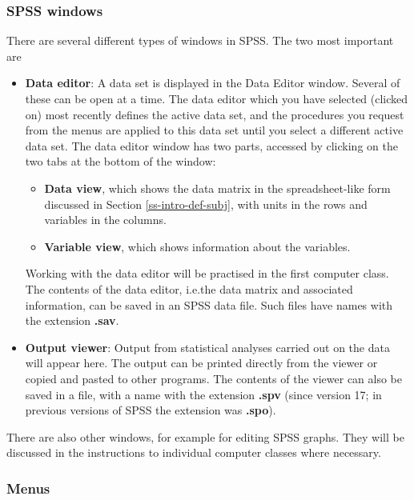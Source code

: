 \documentclass[11pt,a4paper,openany]{book}
\begin{document}
\subsubsection*{SPSS windows}\label{spss-windows}

There are several different types of windows in SPSS. The two most
important are

\begin{itemize}
\item
  \textbf{Data editor}: A data set is displayed in the Data Editor
  window. Several of these can be open at a time. The data editor which
  you have selected (clicked on) most recently defines the active data
  set, and the procedures you request from the menus are applied to this
  data set until you select a different active data set. The data editor
  window has two parts, accessed by clicking on the two tabs at the
  bottom of the window:

  \begin{itemize}
  \item
    \textbf{Data view}, which shows the data matrix in the
    spreadsheet-like form discussed in Section \ref{ss-intro-def-subj},
    with units in the rows and variables in the columns.
  \item
    \textbf{Variable view}, which shows information about the variables.
  \end{itemize}

  Working with the data editor will be practised in the first computer
  class. The contents of the data editor, i.e.the data matrix and
  associated information, can be saved in an SPSS data file. Such files
  have names with the extension \textbf{.sav}.
\item
  \textbf{Output viewer}: Output from statistical analyses carried out
  on the data will appear here. The output can be printed directly from
  the viewer or copied and pasted to other programs. The contents of the
  viewer can also be saved in a file, with a name with the extension
  \textbf{.spv} (since version 17; in previous versions of SPSS the
  extension was \textbf{.spo}).
\end{itemize}

There are also other windows, for example for editing SPSS graphs. They
will be discussed in the instructions to individual computer classes
where necessary.

\subsubsection*{Menus}\label{menus}
\end{document}
